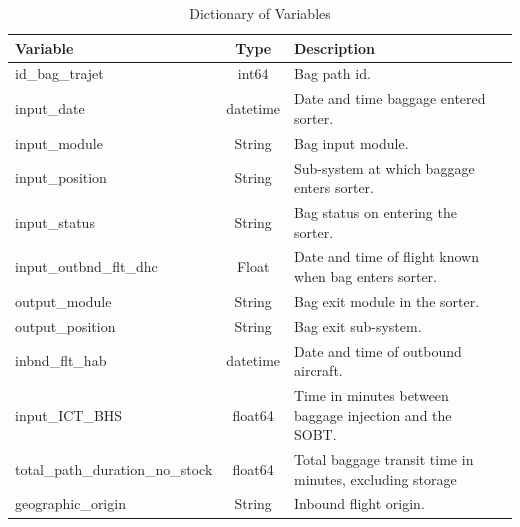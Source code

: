 \documentclass[12pt]{article}
\begin{document}
\FloatBarrier
\begin{table}[ht]
    \centering
    \caption{Dictionary of Variables}
    \label{tab:variables}
    \begin{tabularx}{\textwidth}{lclX}
        \toprule
        \textbf{Variable} & \textbf{Type} & \textbf{Description} \\
        \midrule
        id\_bag\_trajet & int64 & Bag path id. \\
        input\_date & datetime & Date and time baggage entered sorter. \\
        input\_module & String & Bag input module. \\
        input\_position & String & Sub-system at which baggage enters sorter. \\
        input\_status & String & Bag status on entering the sorter. \\
        input\_outbnd\_flt\_dhc & Float & Date and time of flight known when bag enters sorter. \\
        output\_module & String & Bag exit module in the sorter. \\
        output\_position & String & Bag exit sub-system. \\
        inbnd\_flt\_hab & datetime &  Date and time of outbound aircraft.\\
        input\_ICT\_BHS & float64 & Time in minutes between baggage injection and the SOBT. \\
        total\_path\_duration\_no\_stock & float64 & Total baggage transit time in minutes, excluding storage \\
        geographic\_origin & String & Inbound flight origin. \\

\end{tabularx}
\end{table}
\end{document}
